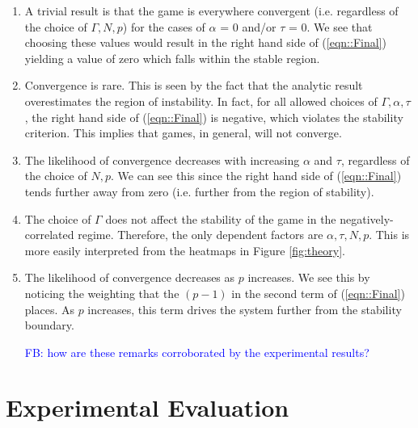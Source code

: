 \documentclass[sigconf,anonymous]{aamas}
\newcommand\fb[1]{\textcolor{blue}{FB: #1}}
\begin{document}
\begin{enumerate}
    \item A trivial result is that the game is everywhere convergent (i.e. regardless of the choice of $\Gamma, N, p$) for the cases of $\alpha$ = 0 and/or $\tau$ = 0.  We see that choosing these values would result in the right hand side of (\ref{eqn::Final}) yielding a value of zero which falls within the stable region.
    \item Convergence is rare. This is seen by the fact that the analytic result overestimates the region of instability. In fact, for all allowed choices of $\Gamma, \alpha, \tau$, the right hand side of (\ref{eqn::Final}) is negative, which violates the stability criterion. This implies that games, in general, will not converge.
    \item The likelihood of convergence decreases with increasing $\alpha$ and $\tau$, regardless of the choice of $N, p$. We can see this since the right hand side of (\ref{eqn::Final}) tends further away from zero (i.e. further from the region of stability).
    \item The choice of $\Gamma$ does not affect the stability of the game in the negatively-correlated regime. Therefore, the only dependent factors are $\alpha, \tau, N, p$. This is more easily interpreted from the heatmaps in Figure \ref{fig:theory}.
    \item The likelihood of convergence decreases as $p$ increases. We see this by noticing the weighting that the $(p-1)$ in the second term of (\ref{eqn::Final}) places. As $p$ increases, this term drives the system further from the stability boundary.

      \fb{how are these remarks corroborated by the experimental results?}

\end{enumerate}


\section{Experimental Evaluation} \label{sec:exev}
\end{document}
